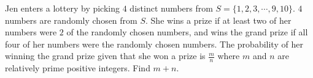 Jen enters a lottery by picking $4$ distinct numbers from $S=\{1,2,3,\cdots,9,10\}.$ $4$ numbers are randomly chosen from $S.$ She wins a prize if at least two of her numbers were $2$ of the randomly chosen numbers, and wins the grand prize if all four of her numbers were the randomly chosen numbers. The probability of her winning the grand prize given that she won a prize is $\tfrac{m}{n}$ where $m$ and $n$ are relatively prime positive integers. Find $m+n$.

